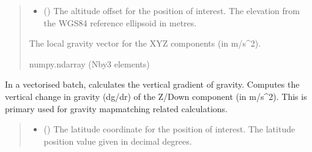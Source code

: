 \documentclass[letterpaper,10pt,english]{sphinxmanual}
\begin{document}
\begin{fulllineitems}
\begin{fulllineitems}
\begin{quote}
\begin{description}
\begin{itemize}
\item {} 
\sphinxAtStartPar
{} () \textendash{} The altitude offset for the position of interest.
The elevation from the WGS\sphinxhyphen{}84 reference ellipsoid in metres.

\end{itemize}

\sphinxAtStartPar
The local gravity vector for the XYZ components (in m/s\textasciicircum{}2).

\sphinxAtStartPar
numpy.ndarray (N\sphinxhyphen{}by\sphinxhyphen{}3 elements)

\end{description}\end{quote}

\end{fulllineitems}


\begin{fulllineitems}
\label{\detokenize{modules/gravity/base:qnav.gravity.base.GravityModel.calc_vertical_grad_vec}}
\pysigstartsignatures
{}
\pysigstopsignatures
\sphinxAtStartPar
In a vectorised batch, calculates the vertical gradient of gravity.
Computes the vertical change in gravity (dg/dr) of the Z/Down
component (in m/s\textasciicircum{}2). This is primary used for gravity map\sphinxhyphen{}matching
related calculations.
\begin{quote}\begin{description}
\begin{itemize}
\item {} 
\sphinxAtStartPar
{} () \textendash{} The latitude coordinate for the position of interest.
The latitude position value given in decimal degrees.


\end{itemize}
\end{description}
\end{quote}
\end{fulllineitems}
\end{fulllineitems}
\end{document}
